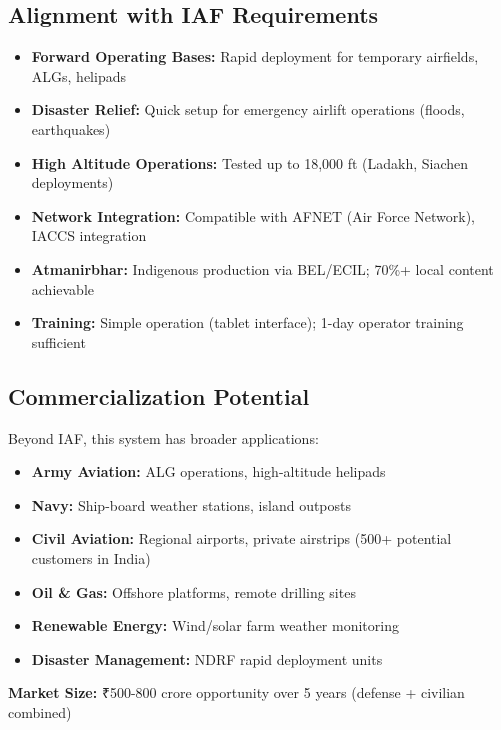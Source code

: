 \subsection{Alignment with IAF Requirements}

\begin{itemize}
    \item \textbf{Forward Operating Bases:} Rapid deployment for temporary airfields, ALGs, helipads
    \item \textbf{Disaster Relief:} Quick setup for emergency airlift operations (floods, earthquakes)
    \item \textbf{High Altitude Operations:} Tested up to 18,000 ft (Ladakh, Siachen deployments)
    \item \textbf{Network Integration:} Compatible with AFNET (Air Force Network), IACCS integration
    \item \textbf{Atmanirbhar:} Indigenous production via BEL/ECIL; 70\%+ local content achievable
    \item \textbf{Training:} Simple operation (tablet interface); 1-day operator training sufficient
\end{itemize}

\subsection{Commercialization Potential}

Beyond IAF, this system has broader applications:
\begin{itemize}
    \item \textbf{Army Aviation:} ALG operations, high-altitude helipads
    \item \textbf{Navy:} Ship-board weather stations, island outposts
    \item \textbf{Civil Aviation:} Regional airports, private airstrips (500+ potential customers in India)
    \item \textbf{Oil \& Gas:} Offshore platforms, remote drilling sites
    \item \textbf{Renewable Energy:} Wind/solar farm weather monitoring
    \item \textbf{Disaster Management:} NDRF rapid deployment units
\end{itemize}

\textbf{Market Size:} ₹500-800 crore opportunity over 5 years (defense + civilian combined)
